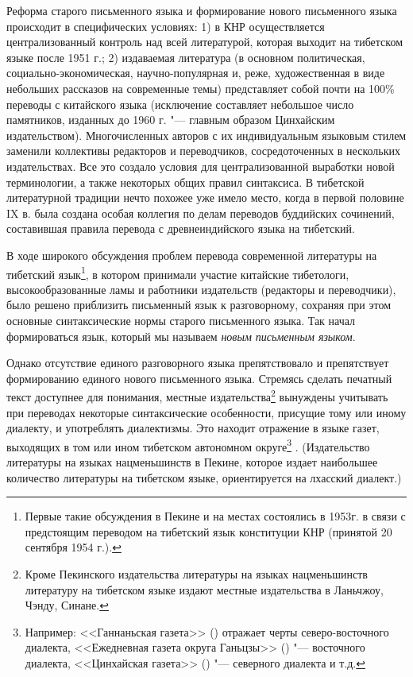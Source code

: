 Реформа старого письменного языка и формирование нового письменного языка происходит в специфических условиях: 1) в КНР осуществляется централизованный контроль над всей литературой, которая выходит на тибетском языке после 1951 г.; 2) издаваемая литература (в основном политическая, социально-экономическая, научно-популярная и, реже, художественная в виде небольших рассказов на современные темы) представляет собой почти на 100\% переводы с китайского языка (исключение составляет небольшое число памятников, изданных до 1960 г. "--- главным образом Цинхайским издательством). Многочисленных авторов с их индивидуальным языковым стилем заменили коллективы редакторов и переводчиков, сосредоточенных в нескольких издательствах. Все это создало условия для централизованной выработки новой терминологии, а также некоторых общих правил синтаксиса. В тибетской литературной традиции нечто похожее уже имело место, когда в первой половине IX в. была создана особая коллегия по делам переводов буддийских сочинений, составившая правила перевода с древнеиндийского языка на тибетский.

В ходе широкого обсуждения проблем перевода современной литературы на тибетский язык\footnote[6]{Первые такие обсуждения в Пекине и на местах состоялись в 1953г. в связи с предстоящим переводом на тибетский язык конституции КНР (принятой 20 сентября 1954 г.).}, в котором принимали участие китайские тибетологи, высокообразованные ламы и работники издательств (редакторы и переводчики), было решено приблизить письменный язык к разговорному, сохраняя при этом основные синтаксические нормы старого письменного языка. Так начал формироваться язык, который мы называем \emph{новым письменным языком}.

Однако отсутствие единого разговорного языка препятствовало и препятствует формированию единого нового письменного языка. Стремясь сделать печатный текст доступнее для понимания, местные издательства\footnote[7]{Кроме Пекинского издательства литературы на языках нацменьшинств литературу на тибетском языке издают местные издательства в Ланьчжоу, Чэнду, Синане.} вынуждены учитывать при переводах некоторые синтаксические особенности, присущие тому или иному диалекту, и употреблять диалектизмы. Это находит отражение в языке газет, выходящих в том или ином тибетском автономном округе\footnote[8]{Например: <<Ганнаньская газета>> () отражает черты северо-восточного диалекта, <<Ежедневная газета округа Ганьцзы>> () "--- восточного диалекта, <<Цинхайская газета>> () "--- северного диалекта и т.д.} . (Издательство литературы на языках нацменьшинств в Пекине, которое издает наибольшее количество литературы на тибетском языке, ориентируется на лхасский диалект.)

